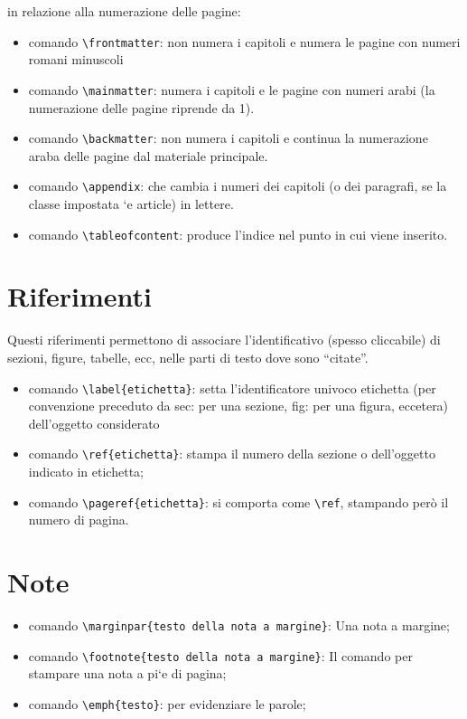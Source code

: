 \documentclass{article}
\begin{document}
            in relazione alla numerazione delle pagine:
            \begin{itemize}
                \item comando \verb!\frontmatter!: non numera i capitoli e numera le pagine con numeri romani minuscoli
                \item comando \verb!\mainmatter!: numera i capitoli e le pagine con numeri arabi (la numerazione delle pagine riprende da 1).
                \item comando \verb!\backmatter!: non numera i capitoli e continua la numerazione araba delle pagine dal materiale principale.
                \item comando \verb!\appendix!: che cambia i numeri dei capitoli (o dei paragrafi, se la classe impostata `e article) in lettere.
                \item comando \verb!\tableofcontent!:  produce l'indice nel punto in cui viene inserito.
            \end{itemize}

        \section{Riferimenti}
            Questi riferimenti permettono di associare l'identificativo (spesso cliccabile) di sezioni, figure, tabelle, ecc, nelle parti di testo dove sono “citate”.
            \begin{itemize}
                \item comando \verb!\label{etichetta}!: setta l'identificatore univoco etichetta (per convenzione preceduto da sec: per una sezione, fig: per una figura, eccetera) dell'oggetto considerato
                \item comando \verb!\ref{etichetta}!: stampa il numero della sezione o dell'oggetto indicato in etichetta;
                \item comando \verb!\pageref{etichetta}!: si comporta come \verb!\ref!, stampando però il numero di pagina.
            \end{itemize}
        
        \section{Note}
            \begin{itemize}
                \item comando \verb!\marginpar{testo della nota a margine}!: Una nota a margine;
                \item comando \verb!\footnote{testo della nota a margine}!: Il comando per stampare una nota a pi`e di pagina;
                \item comando \verb!\emph{testo}!: per evidenziare le parole;
            \end{itemize}
                
\end{document}
